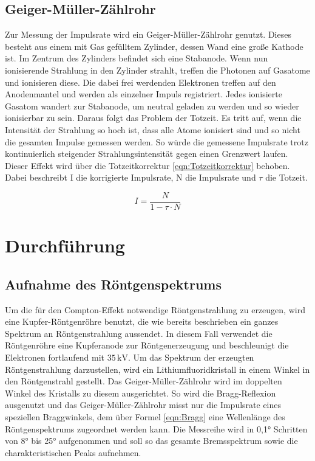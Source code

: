 \documentclass[titlepage = firstcover]{scrartcl}
\begin{document}
        \subsection{Geiger-Müller-Zählrohr} \label{Geiger}
        Zur Messung der Impulsrate wird ein Geiger-Müller-Zählrohr genutzt. Dieses besteht aus einem mit Gas gefülltem Zylinder, dessen Wand eine große
        Kathode ist. Im Zentrum des Zylinders befindet sich eine Stabanode. Wenn nun ionisierende Strahlung in den Zylinder strahlt, treffen die Photonen
        auf Gasatome und ionisieren diese. Die dabei frei werdenden Elektronen treffen auf den Anodenmantel und werden als einzelner Impuls registriert. Jedes
        ionisierte Gasatom wandert zur Stabanode, um neutral geladen zu werden und so wieder ionisierbar zu sein. Daraus folgt das Problem der Totzeit. Es 
        tritt auf, wenn die Intensität der Strahlung so hoch ist, dass alle Atome ionisiert sind und so nicht die gesamten Impulse gemessen werden. So würde 
        die gemessene Impulsrate trotz kontinuierlich steigender Strahlungsintensität gegen einen Grenzwert laufen. Dieser Effekt wird über die 
        Totzeitkorrektur \ref{eqn:Totzeitkorrektur} behoben. Dabei beschreibt I die korrigierte Impulsrate, N die Impulsrate und $\tau$ die Totzeit.
        
        \begin{equation}
            I = \frac{N}{1-\tau \cdot N}
            \label{eqn:Totzeitkorrektur}
        \end{equation}
        

    \section{Durchführung}
        \subsection{Aufnahme des Röntgenspektrums}
        Um die für den Compton-Effekt notwendige Röntgenstrahlung zu erzeugen, wird eine Kupfer-Röntgenröhre benutzt, die wie bereits beschrieben ein ganzes 
        Spektrum an Röntgenstrahlung aussendet. In diesem Fall verwendet die Röntgenröhre eine Kupferanode zur Röntgenerzeugung und beschleunigt die Elektronen
        fortlaufend mit $35 \, \text{kV}$. Um das Spektrum der 
        erzeugten Röntgenstrahlung darzustellen, wird ein Lithiumfluoridkristall in einem Winkel in den Röntgenstrahl gestellt. Das Geiger-Müller-Zählrohr
        wird im doppelten Winkel des Kristalls zu diesem ausgerichtet. So wird die Bragg-Reflexion ausgenutzt und das Geiger-Müller-Zählrohr misst nur die
        Impulsrate eines speziellen Braggwinkels, dem über Formel \ref{eqn:Bragg} eine Wellenlänge des Röntgenspektrums zugeordnet werden kann. Die Messreihe
        wird in 0,1° Schritten von 8° bis 25° aufgenommen und soll so das gesamte Bremsspektrum sowie die charakteristischen Peaks aufnehmen.
        
\end{document}
